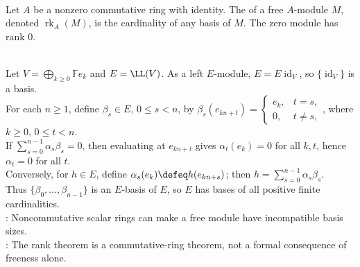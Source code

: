 \begin{definition} \label{def:rank-of-free-module} \\
Let $A$ be a nonzero commutative ring with identity. The  of a free
$A$-module $M$, denoted $\operatorname{rk}_A(M)$, is the cardinality of any
basis of $M$. The zero module has rank $0$.
\end{definition}

\begin{example} \label{ex:noncommutative-rank-failure-endomorphism-ring} \\
Let $V=\bigoplus_{k\geq0}\mathbb{F}e_k$ and $E=\LL(V)$. As a left $E$-module, $E=E\operatorname{id}_V$, so $\{\operatorname{id}_V\}$ is a basis.\\
For each $n\geq1$, define $\beta_s\in E$, $0\leq s<n$, by $\beta_s(e_{kn+t})=
\begin{cases}
e_k,&t=s,\\
0,&t\neq s,
\end{cases}$, where $k\geq0$, $0\leq t<n$.\\
If $\sum\limits_{s=0}^{n-1}\alpha_s\beta_s=0$, then evaluating at $e_{kn+t}$ gives $\alpha_t(e_k)=0$ for all $k,t$, hence $\alpha_t=0$ for all $t$.\\
Conversely, for $h\in E$, define $\alpha_s(e_k)\defeq h(e_{kn+s})$; then $h=\sum\limits_{s=0}^{n-1}\alpha_s\beta_s$.\\
Thus $\{\beta_0,\ldots,\beta_{n-1}\}$ is an $E$-basis of $E$, so $E$ has bases of all positive finite cardinalities.\\
: Noncommutative scalar rings can make a free module have incompatible basis sizes.\\
: The rank theorem is a commutative-ring theorem, not a formal consequence of freeness alone.
\end{example}

